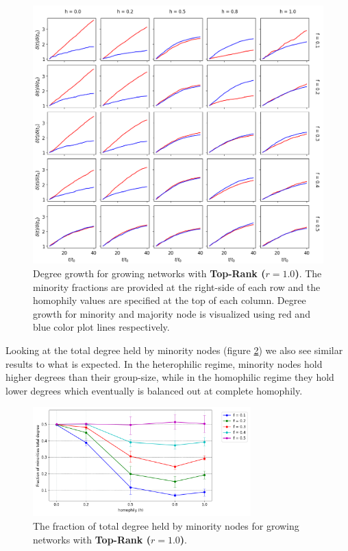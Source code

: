 \begin{figure}[h!]
	\centering
	\includegraphics[width=1.0\textwidth]{images/dg_growth_top10.png}
	\caption{Degree growth for growing networks with \textbf{Top-Rank ($r = 1.0$)}. The minority fractions are provided at the right-side of each row and the homophily values are specified at the top of each column. Degree growth for minority and majority node is visualized using red and blue color plot lines respectively.}
	\label{dg_growth_top10_fig}
\end{figure}

Looking at the total degree held by minority nodes (figure \ref{mf_growth_top10_fig}) we also see similar results to what is expected. In the heterophilic regime, minority nodes hold higher degrees than their group-size, while in the homophilic regime they hold lower degrees which eventually is balanced out at complete homophily.

\begin{figure}
	\centering
	\includegraphics[trim=0 5 0 10, clip, width=0.75\textwidth]{images/mf_growth_top10.png}
	\caption{The fraction of total degree held by minority nodes for growing networks with \textbf{Top-Rank ($r = 1.0$)}.}
	\label{mf_growth_top10_fig}
\end{figure}

